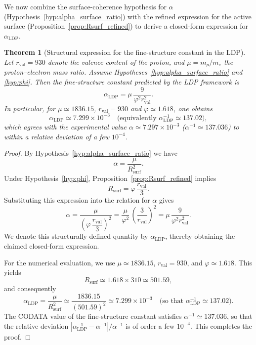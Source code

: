 \documentclass[11pt,a4paper]{article}
\theoremstyle{plain}
\newtheorem{theorem}{Theorem}
\theoremstyle{definition}
\theoremstyle{remark}
\begin{document}
We now combine the surface-coherence hypothesis for \(\alpha\) (Hypothesis~\ref{hyp:alpha_surface_ratio}) with the refined expression for the active surface (Proposition~\ref{prop:Rsurf_refined}) to derive a closed-form expression for \(\alpha_{\mathrm{LDP}}\).

\begin{theorem}[Structural expression for the fine-structure constant in the LDP]
\label{thm:alpha_LDP}
Let \(r_{\mathrm{val}} = 930\) denote the valence content of the proton, and
\(\mu = m_p/m_e\) the proton--electron mass ratio.
Assume Hypotheses~\ref{hyp:alpha_surface_ratio} and \ref{hyp:phi}. Then the
fine-structure constant predicted by the LDP framework is
\[
\alpha_{\mathrm{LDP}}
= \mu\, \frac{9}{\varphi^2 r_{\mathrm{val}}^2}.
\]
In particular, for \(\mu \simeq 1836.15\), \(r_{\mathrm{val}} = 930\) and
\(\varphi \simeq 1.618\), one obtains
\[
\alpha_{\mathrm{LDP}} \simeq 7.299\times 10^{-3}
\quad\text{(equivalently } \alpha_{\mathrm{LDP}}^{-1} \simeq 137.02\text{)},
\]
which agrees with the experimental value \(\alpha \simeq 7.297\times 10^{-3}\)
(\(\alpha^{-1} \simeq 137.036\)) to within a relative deviation of a few
\(10^{-4}\).
\end{theorem}

\begin{proof}
  By Hypothesis~\ref{hyp:alpha_surface_ratio} we have
\[
\alpha = \frac{\mu}{R_{\mathrm{surf}}^2}.
\]
Under Hypothesis~\ref{hyp:phi}, Proposition~\ref{prop:Rsurf_refined} implies
\[
R_{\mathrm{surf}} = \varphi\, \frac{r_{\mathrm{val}}}{3}.
\]
Substituting this expression into the relation for \(\alpha\) gives
\[
\alpha
= \frac{\mu}{\left(\varphi\, \dfrac{r_{\mathrm{val}}}{3}\right)^2}
= \frac{\mu}{\varphi^2}\, \left(\frac{3}{r_{\mathrm{val}}}\right)^2
= \mu\, \frac{9}{\varphi^2 r_{\mathrm{val}}^2}.
\]
We denote this structurally defined quantity by \(\alpha_{\mathrm{LDP}}\),
thereby obtaining the claimed closed-form expression.

  For the numerical evaluation, we use
  \(\mu \simeq 1836.15\),
  \(r_{\mathrm{val}} = 930\),
  and \(\varphi \simeq 1.618\).
  This yields
  \[
    R_{\mathrm{surf}} \simeq 1.618 \times 310 \simeq 501.59,
  \]
  and consequently
  \[
    \alpha_{\mathrm{LDP}} = \frac{\mu}{R_{\mathrm{surf}}^2}
    \simeq \frac{1836.15}{(501.59)^2} 
    \simeq 7.299\times 10^{-3} 
    \quad\text{(so that } \alpha_{\mathrm{LDP}}^{-1} \simeq 137.02\text{)}.
  \]
  The CODATA value of the fine-structure constant satisfies
  \(\alpha^{-1} \simeq 137.036\), so that the relative deviation
  \(|\alpha_{\mathrm{LDP}}^{-1} - \alpha^{-1}|/\alpha^{-1}\) is of order a few
  \(10^{-4}\). This completes the proof.
\end{proof}
\end{document}
